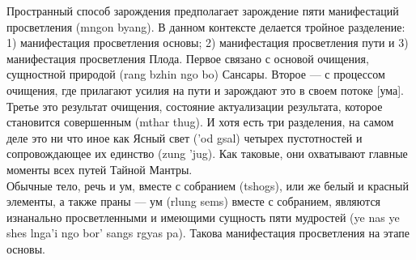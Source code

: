 \begin{siderules}
Пространный способ зарождения предполагает зарожде\-ние пяти манифестаций просветления
(mngon byang). В данном контексте делается тройное разделение: 1) мани\-фестация
просветления основы; 2) манифестация просветления пути и 3) манифестация просветления
Плода. Первое связано с основой очищения, сущностной приро\-дой (rang bzhin ngo bo)
Сансары. Второе — с процессом очищения, где прилагают усилия на пути и зарождают это в
своем потоке [ума]. Третье  это результат очищения, состояние актуализации результата,
которое становится совершенным (mthar thug). И хотя есть три разделения, на самом деле это
ни что иное как Ясный свет ('od gsal) четырех пустотностей и сопровождающее их единство
(zung 'jug). Как таковые, они охватывают главные моменты всех путей Тайной Мантры.\\

Обычные тело, речь и ум, вместе с собранием (tshogs), или же белый и красный элементы, а
также праны — ум (rlung sems) вместе с собранием, являются изнанально просветленными
и имеющими сущность пяти мудростей (ye nas ye shes lnga'i ngo bor' sangs rgyas pa). Такова
манифестация просветления на этапе основы.\\


\end{siderules}
